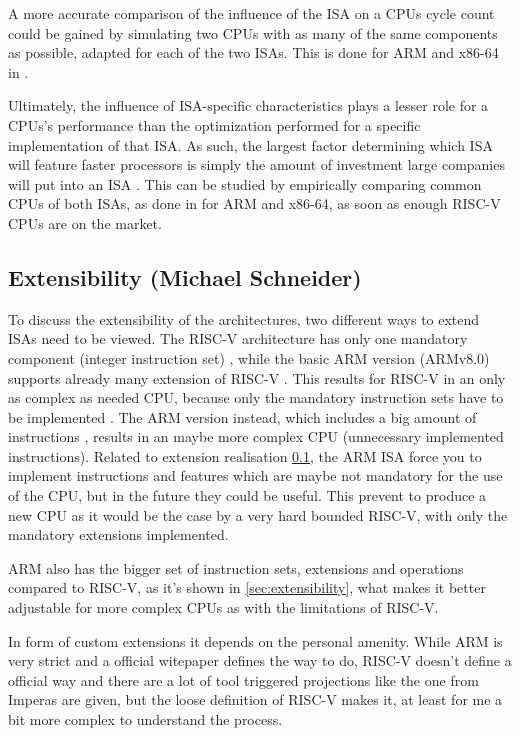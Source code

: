 \documentclass[conference]{IEEEtran}
\begin{document}
	A more accurate comparison of the influence of the \gls{ISA} on a \gls{CPU}s cycle count could be gained
	by simulating two \glspl{CPU} with as many of the same components as possible, adapted for each of the two \glspl{ISA}.
	This is done for ARM and x86-64 in \cite{Akram2017}.

	Ultimately, the influence of \gls{ISA}-specific characteristics plays a lesser role for a \glspl{CPU}'s performance
	than the optimization performed for a specific implementation of that \gls{ISA}.
	As such, the largest factor determining which \gls{ISA} will feature faster processors is simply the amount of investment
	large companies will put into an \gls{ISA} \cite{Blem2013}.
	This can be studied by empirically comparing common \glspl{CPU} of both \glspl{ISA}, as done in \cite{Blem2013} for ARM and
	x86-64, as soon as enough RISC-V \glspl{CPU} are on the market.
	
	\subsection{Extensibility (Michael Schneider)} \label{dis:Extensibility}
	To discuss the extensibility of the architectures, two different ways to extend \glspl{ISA} need to be viewed. The RISC-V architecture has only one mandatory component (integer instruction set) \cite{Waterman2017}, while the basic ARM version (ARMv8.0) supports already many extension of RISC-V \cite{Arm2020}. 
	This results for RISC-V in an only as complex as needed CPU, because only the mandatory instruction sets have to be implemented \cite{Waterman2017}. The ARM version instead, which includes a big amount of instructions \cite{Arm2020}, results in an maybe more complex CPU (unnecessary implemented instructions). Related to extension realisation \ref{dis:Extensibility}, the ARM \gls{ISA} force you to implement instructions and features which are maybe not mandatory for the use of the CPU, but in the future they could be useful. This prevent to produce a new CPU as it would be the case by a very hard bounded RISC-V, with only the mandatory extensions implemented. \cite{Waterman2017} \cite{Arm2020}
	
	ARM also has the bigger set of instruction sets, extensions and operations compared to RISC-V, as it's shown in \ref{sec:extensibility}, what makes it better adjustable for more complex CPUs as with the limitations of RISC-V.

	In form of custom extensions it depends on the personal amenity. While ARM is very strict and a official witepaper \cite{LauranneChoquin2020} defines the way to do, RISC-V doesn't define a official way and there are a lot of tool triggered projections like the one from Imperas \cite{Limited2019} are given, but the loose definition of RISC-V makes it, at least for me a bit more complex to understand the process.
	
\end{document}
